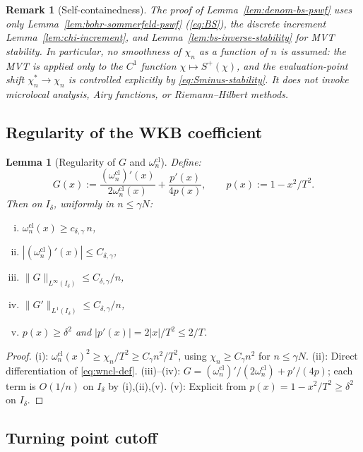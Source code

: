 \documentclass[12pt,a4paper]{amsart}
\newtheorem{lemma}[theorem]{Lemma}
\newtheorem{remark}[theorem]{Remark}
\newcommand{\wncl}{\omega_n^{\mathrm{cl}}}
\begin{document}
\begin{remark}[Self-containedness]
The proof of Lemma~\ref{lem:denom-bs-pswf} uses only
Lemma~\ref{lem:bohr-sommerfeld-pswf} (\eqref{eq:BS}),
the discrete increment Lemma~\ref{lem:chi-increment},
and Lemma~\ref{lem:bs-inverse-stability} for MVT stability.
In particular, no smoothness of $\chi_n$ as a function of $n$
is assumed: the MVT is applied only to the $C^1$ function
$\chi \mapsto S^+(\chi)$, and the evaluation-point shift
$\chi_n^* \to \chi_n$ is controlled explicitly by
\eqref{eq:Sminus-stability}.
It does not invoke microlocal analysis, Airy functions,
or Riemann--Hilbert methods.
\end{remark}

\subsection{Regularity of the WKB coefficient}

\begin{lemma}[Regularity of $G$ and $\wncl$]%
\label{lem:G-regularity}
Define:
\begin{equation}\label{eq:G-def}
  G(x) := \frac{(\wncl)'(x)}{2\wncl(x)} + \frac{p'(x)}{4p(x)},
  \qquad p(x) := 1 - x^2/T^2.
\end{equation}
Then on $I_\delta$, uniformly in $n \le \gamma N$:
\begin{enumerate}[(i)]
  \item $\wncl(x) \ge c_{\delta,\gamma}\,n$,
  \item $|(\wncl)'(x)| \le C_{\delta,\gamma}$,
  \item $\|G\|_{L^\infty(I_\delta)} \le C_{\delta,\gamma}/n$,
  \item $\|G'\|_{L^1(I_\delta)} \le C_{\delta,\gamma}/n$,
  \item $p(x) \ge \delta^2$ and
        $|p'(x)| = 2|x|/T^2 \le 2/T$.
\end{enumerate}
\end{lemma}

\begin{proof}
(i): $\wncl(x)^2 \ge \chi_n/T^2 \ge C_\gamma n^2/T^2$,
using $\chi_n \ge C_\gamma n^2$ for $n \le \gamma N$.
(ii): Direct differentiation of \eqref{eq:wncl-def}.
(iii)--(iv): $G = (\wncl)'/(2\wncl) + p'/(4p)$;
each term is $O(1/n)$ on $I_\delta$ by (i),(ii),(v).
(v): Explicit from $p(x) = 1 - x^2/T^2 \ge \delta^2$
on $I_\delta$.
\end{proof}

\subsection{Turning point cutoff}
\end{document}
